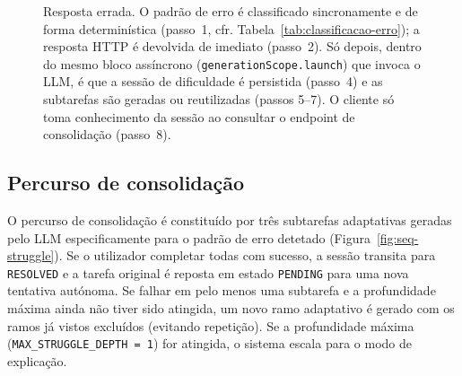 \begin{figure}[H]
	\caption[Sequ\^encia: resposta errada e activa\c{c}\~ao do percurso adaptativo]{Resposta errada. O padr\~ao de erro \'e classificado sincronamente e de forma determin\'istica (passo~1, cfr. Tabela~\ref{tab:classificacao-erro}); a resposta HTTP \'e devolvida de imediato (passo~2). S\'o depois, dentro do mesmo bloco ass\'incrono (\texttt{generationScope.launch}) que invoca o LLM, \'e que a sess\~ao de dificuldade \'e persistida (passo~4) e as subtarefas s\~ao geradas ou reutilizadas (passos 5--7). O cliente s\'o toma conhecimento da sess\~ao ao consultar o endpoint de consolida\c{c}\~ao (passo~8).}
	\label{fig:seq-wrong}
\end{figure}

\subsection{Percurso de consolida\c{c}\~ao}
\label{ssec:seq-struggle}

O percurso de consolida\c{c}\~ao \'e constitu\'ido por tr\^es subtarefas
adaptativas geradas pelo LLM especificamente para o padr\~ao de erro detetado
(Figura~\ref{fig:seq-struggle}). Se o utilizador completar todas com sucesso,
a sess\~ao transita para \texttt{RESOLVED} e a tarefa original \'e reposta em
estado \texttt{PENDING} para uma nova tentativa aut\'onoma. Se falhar em pelo
menos uma subtarefa e a profundidade m\'axima ainda n\~ao tiver sido atingida,
um novo ramo adaptativo \'e gerado com os ramos j\'a vistos exclu\'idos
(evitando repeti\c{c}\~ao). Se a profundidade m\'axima (\texttt{MAX\_STRUGGLE\_DEPTH = 1})
for atingida, o sistema escala para o modo de explica\c{c}\~ao.


